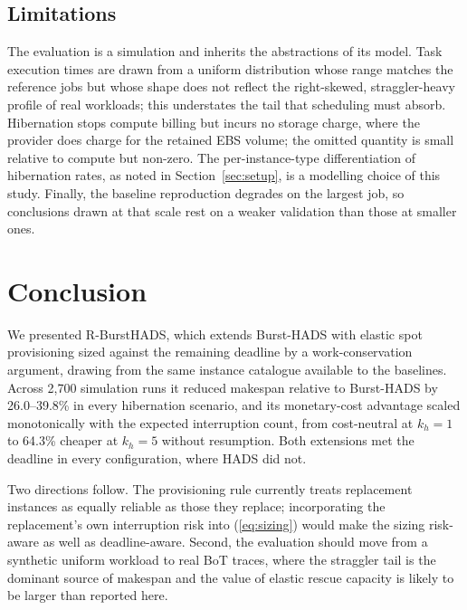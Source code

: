 \documentclass[conference]{IEEEtran}
\begin{document}
\subsection{Limitations}

The evaluation is a simulation and inherits the abstractions of its model. Task
execution times are drawn from a uniform distribution whose range matches the
reference jobs but whose shape does not reflect the right-skewed,
straggler-heavy profile of real workloads; this understates the tail that
scheduling must absorb. Hibernation stops compute billing but incurs no storage
charge, where the provider does charge for the retained EBS volume; the omitted
quantity is small relative to compute but non-zero. The per-instance-type
differentiation of hibernation rates, as noted in Section~\ref{sec:setup}, is a
modelling choice of this study. Finally, the baseline reproduction degrades on
the largest job, so conclusions drawn at that scale rest on a weaker validation
than those at smaller ones.

\section{Conclusion}

We presented R-BurstHADS, which extends Burst-HADS with elastic spot
provisioning sized against the remaining deadline by a work-conservation
argument, drawing from the same instance catalogue available to the baselines.
Across 2{,}700 simulation runs it reduced makespan relative to Burst-HADS by
26.0--39.8\% in every hibernation scenario, and its monetary-cost advantage
scaled monotonically with the expected interruption count, from cost-neutral at
$k_h=1$ to 64.3\% cheaper at $k_h=5$ without resumption. Both extensions met the
deadline in every configuration, where HADS did not.

Two directions follow. The provisioning rule currently treats replacement
instances as equally reliable as those they replace; incorporating the
replacement's own interruption risk into (\ref{eq:sizing}) would make the sizing
risk-aware as well as deadline-aware. Second, the evaluation should move from a
synthetic uniform workload to real BoT traces, where the straggler tail is the
dominant source of makespan and the value of elastic rescue capacity is likely
to be larger than reported here.
\end{document}
